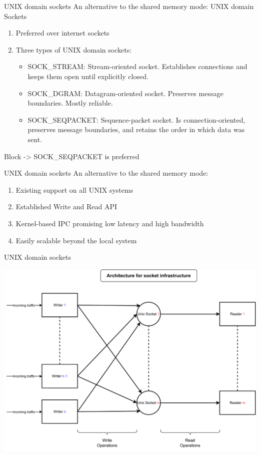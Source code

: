 \documentclass[11pt,english,table,dvipsnames]{beamer}
\begin{document}
\begin{frame}{UNIX domain sockets}
    An alternative to the shared memory mode\@: UNIX domain Sockets
    \\
    \begin{enumerate}
        \item Preferred over internet sockets
        \item Three types of UNIX domain sockets\@:
            \begin{itemize}
                \item SOCK\_STREAM\@: Stream-oriented socket. Establishes connections and keeps them open until explicitly closed.
                \item SOCK\_DGRAM\@: Datagram-oriented socket. Preserves message boundaries. Mostly reliable.
                \item SOCK\_SEQPACKET\@: Sequence-packet socket. Is connection-oriented, preserves message boundaries, and retains the order in which data was sent.
            \end{itemize}
    \end{enumerate}
    \begin{block}{Block}
        -> SOCK\_SEQPACKET is preferred
    \end{block}
\end{frame}

\begin{frame}{UNIX domain sockets}
    An alternative to the shared memory mode\@:
    \begin{enumerate}
        \item Existing support on all UNIX systems
        \item Established Write and Read API
        \item Kernel-based IPC promising low latency and high bandwidth
        \item Easily scalable beyond the local system
    \end{enumerate}
\end{frame}

\begin{frame}{UNIX domain sockets}
    \begin{center}
        \includegraphics[width=0.8\linewidth]{images/SocketArchitecture.pdf}
    \end{center}
\end{frame}
\end{document}
